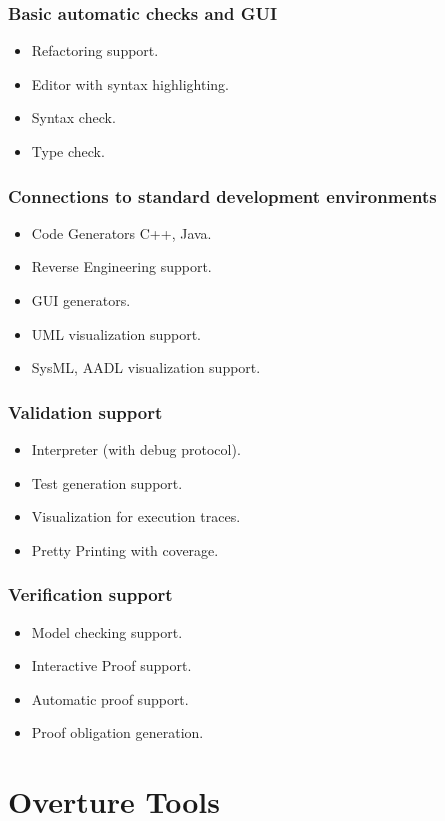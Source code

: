 \documentclass{beamer}
\begin{document}
\frame
{
  \frametitle{Basic automatic checks and GUI}

  \begin{itemize}
  \item<1-> Refactoring support.
  \item<1-> Editor with syntax highlighting.
  \item<1-> Syntax check.      
  \item<1-> Type check.
  \end{itemize}
}

\frame
{
  \frametitle{Connections to standard development environments}

  \begin{itemize}
  \item<1-> Code Generators C++, Java.
  \item<1-> Reverse Engineering support.
  \item<1-> GUI generators.      
  \item<1-> UML visualization support.
  \item<1-> SysML, AADL visualization support.
  \end{itemize}
}

\frame
{
  \frametitle{Validation support}

  \begin{itemize}
  \item<1-> Interpreter (with debug protocol).
  \item<1-> Test generation support.
  \item<1-> Visualization for execution traces.      
  \item<1-> Pretty Printing with coverage.
  \end{itemize}
}

\frame
{
  \frametitle{Verification support}

  \begin{itemize}
  \item<1-> Model checking support.
  \item<1-> Interactive Proof support.
  \item<1-> Automatic proof support.      
  \item<1-> Proof obligation generation.
  \end{itemize}
}


\section{Overture Tools}
\end{document}
